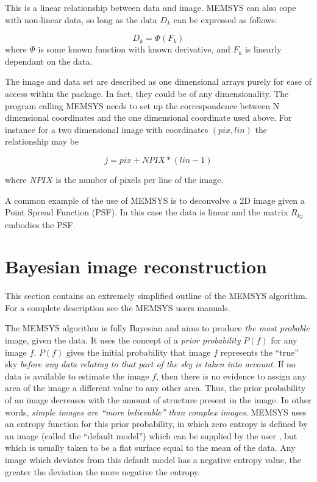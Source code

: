 This is a linear relationship between data and image. MEMSYS can also cope
with non-linear data, so long as the data $D_{k}$ can be expressed as follows:

\begin {equation}
D_{k} = \Phi(F_{k})
\end {equation}
 where $\Phi$ is some known function with known derivative, and $F_{k}$ is
linearly dependant on the data.

The image and data set are described as one dimensional arrays purely for ease
of access within the package. In fact, they could be of any dimensionality. The
program calling MEMSYS needs to set up the correspondence between N dimensional
coordinates and the one dimensional coordinate used above. For instance for a
two dimensional image with coordinates $(pix,lin)$ the relationship may be

\begin {equation}
 j = pix + NPIX*(lin-1)
\end {equation}

where $NPIX$ is the number of pixels per line of the image.

A common example of the use of MEMSYS is to deconvolve a 2D image given a Point
Spread Function (PSF). In this case the data is linear and the matrix $R_{kj}$
embodies the PSF.

\section {Bayesian image reconstruction}
\label {SEC:ENTROPY}
This section contains an extremely simplified outline of the MEMSYS algorithm.
For a complete description see the MEMSYS users manuals.

The MEMSYS algorithm is fully Bayesian and aims to produce {\em the most
probable} image, given the data. It uses the concept of a {\em prior
probability} $P(f)$ for any image $f$. $P(f)$ gives the initial probability
that image $f$ represents the ``true'' sky {\em before any data relating to
that part of the sky is taken into account}. If no data is available to
estimate the image $f$, then there is no evidence to assign any area of the
image a different value to any other area. Thus, the prior probability of an
image decreases with the amount of structure present in the image. In other
words, {\em simple images are ``more believable'' than complex images}. MEMSYS
uses an entropy function for this prior probability, in which zero entropy is
defined by an image (called the ``default model'') which can be supplied by the
user , but which is usually taken to be a flat surface equal to the mean of the
data. Any image which deviates from this default model has a negative entropy
value, the greater the deviation the more negative the entropy.


